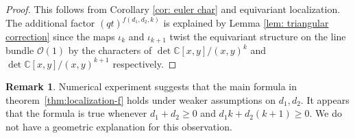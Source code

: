 \documentclass[12pt]{amsart}
\newcommand{\C}{\mathbb{C}}
\newcommand{\CO}{\mathcal{O}}
\numberwithin{equation}{section}
\theoremstyle{definition}
\newtheorem{remark}[theorem]{Remark}
\begin{document}
\begin{proof}
This follows from Corollary \ref{cor: euler char} and equivariant localization. The additional factor $(qt)^{f(d_1,d_2,k)}$ is explained by Lemma \ref{lem: triangular correction} since the maps $\iota_k$ and $\iota_{k+1}$ twist the equivariant structure on the line bundle $\CO(1)$ by the characters of $\det\C[x,y]/(x,y)^k$ and $\det\C[x,y]/(x,y)^{k+1}$ respectively.
\end{proof}

\begin{remark}
  Numerical experiment suggests that the main formula in theorem~\ref{thm:localization-f} holds under weaker assumptions on \(d_1,d_2\).
  It appears that the formula is true whenever \(d_1+d_2\ge 0\) and \(d_1k+d_2 (k+1)\ge 0\). We do not have a geometric explanation for this
  observation.
\end{remark}
\end{document}
